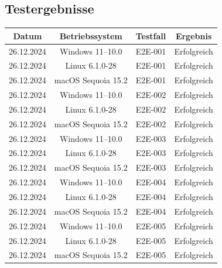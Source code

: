 \documentclass[a4paper,12pt]{report}
\begin{document}
    \subsection{Testergebnisse}
    \begin{table}[h!]
        \centering
        \setlength{\leftmargini}{0.4cm}
        \begin{tabular}{|c|c|c|c|}
            \hline
            \textbf{Datum} & \textbf{Betriebssystem} & \textbf{Testfall} & \textbf{Ergebnis} \\ \hline
            26.12.2024     & Windows 11--10.0        & E2E-001           & Erfolgreich       \\ \hline
            26.12.2024     & Linux 6.1.0-28          & E2E-001           & Erfolgreich       \\ \hline
            26.12.2024     & macOS Sequoia 15.2      & E2E-001           & Erfolgreich       \\ \hline
            26.12.2024     & Windows 11--10.0        & E2E-002           & Erfolgreich       \\ \hline
            26.12.2024     & Linux 6.1.0-28          & E2E-002           & Erfolgreich       \\ \hline
            26.12.2024     & macOS Sequoia 15.2      & E2E-002           & Erfolgreich       \\ \hline
            26.12.2024     & Windows 11--10.0        & E2E-003           & Erfolgreich       \\ \hline
            26.12.2024     & Linux 6.1.0-28          & E2E-003           & Erfolgreich       \\ \hline
            26.12.2024     & macOS Sequoia 15.2      & E2E-003           & Erfolgreich       \\ \hline
            26.12.2024     & Windows 11--10.0        & E2E-004           & Erfolgreich       \\ \hline
            26.12.2024     & Linux 6.1.0-28          & E2E-004           & Erfolgreich       \\ \hline
            26.12.2024     & macOS Sequoia 15.2      & E2E-004           & Erfolgreich       \\ \hline
            26.12.2024     & Windows 11--10.0        & E2E-005           & Erfolgreich       \\ \hline
            26.12.2024     & Linux 6.1.0-28          & E2E-005           & Erfolgreich       \\ \hline
            26.12.2024     & macOS Sequoia 15.2      & E2E-005           & Erfolgreich       \\ \hline

\end{tabular}
\end{table}
\end{document}

